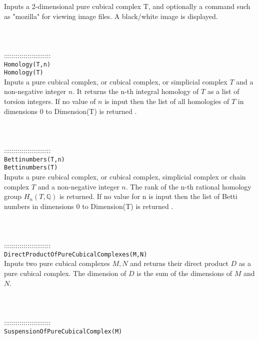 \documentclass[a4paper,11pt]{report}
\begin{document}
{ Inputs a 2-dimensional pure cubical complex T, and optionally a command such
as "mozilla" for viewing image files. A black/white image is displayed. \\
 \\
 \\
 \\
 ::::::::::::::::::::::::\\
 \texttt{Homology(T,n)}\\
 \texttt{Homology(T)}\\
 

 Inputs a pure cubical complex, or cubical complex, or simplicial complex $T$ and a non-negative integer $n$. It returns the n-th integral homology of $T$ as a list of torsion integers. If no value of $n$ is input then the list of all homologies of $T$ in dimensions 0 to Dimension(T) is returned . \\
 \\
 \\
 \\
 ::::::::::::::::::::::::\\
 \texttt{Bettinumbers(T,n)}\\
 \texttt{Bettinumbers(T)}\\
 

 Inputs a pure cubical complex, or cubical complex, simplicial complex or chain
complex $T$ and a non-negative integer $n$. The rank of the n-th rational homology group $H_n(T,\mathbb Q)$ is returned. If no value for n is input then the list of Betti numbers in
dimensions 0 to Dimension(T) is returned . \\
 \\
 \\
 \\
 ::::::::::::::::::::::::\\
 \texttt{DirectProductOfPureCubicalComplexes(M,N)}\\
 

 Inputs two pure cubical complexes $M,N$ and returns their direct product $D$ as a pure cubical complex. The dimension of $D$ is the sum of the dimensions of $M$ and $N$. \\
 \\
 \\
 \\
 ::::::::::::::::::::::::\\
 \texttt{SuspensionOfPureCubicalComplex(M)}\\
 

}
\end{document}
